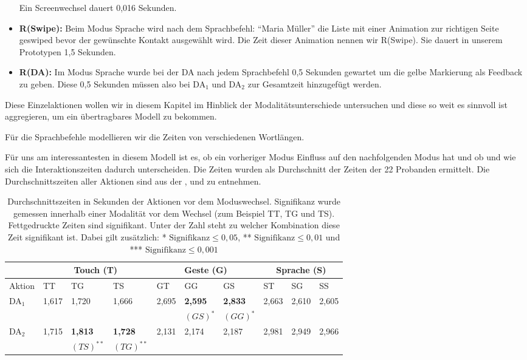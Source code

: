 \begin{itemize}
	Ein Screenwechsel dauert 0,016 Sekunden.
	\item \textbf{R(Swipe):} Beim Modus Sprache wird nach dem Sprachbefehl: "`Maria Müller"' die Liste mit einer Animation zur richtigen Seite geswiped bevor der gewünschte Kontakt ausgewählt wird. Die Zeit dieser Animation nennen wir R(Swipe). Sie dauert in unserem Prototypen 1,5 Sekunden.
	\item \textbf{R(DA):} Im Modus Sprache wurde bei der DA nach jedem Sprachbefehl 0,5 Sekunden gewartet um die gelbe Markierung als Feedback zu geben. Diese 0,5 Sekunden müssen also bei DA$_1$ und DA$_2$ zur Gesamtzeit hinzugefügt werden.
\end{itemize}
Diese Einzelaktionen wollen wir in diesem Kapitel im Hinblick der Modalitätsunterschiede untersuchen und diese so weit es sinnvoll ist aggregieren, um ein übertragbares Modell zu bekommen.

Für die Sprachbefehle modellieren wir die Zeiten von verschiedenen Wortlängen.

Für uns am interessantesten in diesem Modell ist es, ob ein vorheriger Modus Einfluss auf den nachfolgenden Modus hat und ob und wie sich die Interaktionszeiten dadurch unterscheiden.
Die Zeiten wurden als Durchschnitt der Zeiten der 22 Probanden ermittelt.
Die Durchschnittszeiten aller Aktionen sind aus der ,  und  zu entnehmen.
\begin{table}[ht]
  \centering
	\begin{tabular}{|l|l|l|l|l|l|l|l|l|l|}
		\hline
		& \multicolumn{3}{|c|}{Touch (T)} & \multicolumn{3}{|c|}{Geste (G)}&\multicolumn{3}{|c|}{Sprache (S)}\\
		\hline
		Aktion 					& TT 		& TG 		& TS 		& GT 		& GG 		& GS 		& ST 		& SG 		& SS\\
		\hline
		DA$_1$ 	& 1,617 & 1,720	& 1,666 &	2,695	&	\textbf{2,595}	&	\textbf{2,833}	&	2,663	& 2,610	& 2,605\\
					&  			&  			&				&				&		\small{$(GS)^*$}					&	\small{$(GG)^*$}			 			&		&	& \\
		\hline
		DA$_2$ 	& 1,715 & \textbf{1,813}	& \textbf{1,728}	&	2,131	&	2,174	&	2,187	&	2,981	&	2,949	& 2,966\\
					&  			& \small{$(TS)^{**}$}				&	\small{$(TG)^{**}$}			&				&				&				&		&	& \\
		\hline
  \end{tabular}
	\caption[Durchschnittszeiten der Aktionen vor dem Moduswechsel]{Durchschnittszeiten in Sekunden der Aktionen vor dem Moduswechsel. Signifikanz wurde gemessen innerhalb einer Modalität vor dem Wechsel (zum Beispiel TT, TG und TS). Fettgedruckte Zeiten sind signifikant. Unter der Zahl steht zu welcher Kombination diese Zeit signifikant ist. Dabei gilt zusätzlich: * $\text{Signifikanz} \leq 0,05$, ** $\text{Signifikanz} \leq 0,01$ und *** $\text{Signifikanz} \leq 0,001$}
\label{tab:OperatorzeitenVorWechsel1}
\end{table}

